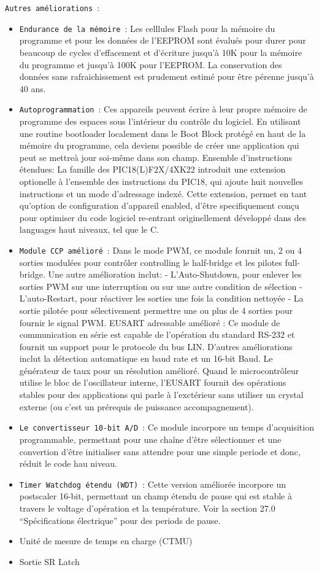 \documentclass[a4paper, 12pt]{book}
\newcounter{program}[subsection]
\begin{document}
\texttt{Autres améliorations}~:
\begin{itemize}
\item \texttt{Endurance de la mémoire}~:
Les celllules Flash pour la mémoire du programme et pour les données de l’EEPROM sont évalués pour durer pour beaucoup de cycles d’effacement et d’écriture jusqu’à 10K pour la mémoire du programme et jusqu’à 100K pour l’EEPROM. La conservation des données sans rafraichissement est prudement estimé pour être pérenne jusqu’à 40 ans.
\item \texttt{Autoprogrammation}~:
Ces appareils peuvent écrire à leur propre mémoire de programme des espaces sous l’intérieur du contrôle du logiciel. En utilisant une routine bootloader localement dans le Boot Block protégé en haut de la mémoire du programme, cela deviens possible de créer une application qui peut se mettreà jour soi-même dans son champ.
Ensemble d’instructions étendues:
La famille des PIC18(L)F2X/4XK22 introduit une extension optionelle à l’ensemble des instructions du PIC18, qui ajoute huit nouvelles instructions et un mode d’adressage indexé.
Cette extension, permet en tant qu’option de configuration d’appareil enabled, d’être specifiquement conçu pour optimiser du code logiciel re-entrant originellement développé dans des languages haut niveaux, tel que le C.
\item \texttt{Module CCP amélioré}~:
Dans le mode PWM, ce module fournit un, 2 ou 4 sorties modulées pour contrôler controlling le half-bridge et les pilotes full-bridge. Une autre amélioration inclut:
- L’Auto-Shutdown, pour enlever les sorties PWM sur une interruption ou sur une autre condition de sélection
- L’auto-Restart, pour réactiver les sorties une fois la condition nettoyée
- La sortie pilotée pour sélectivement permettre une ou plus de 4 sorties pour fournir le signal PWM.
EUSART adressable amélioré :
Ce module de communication en série est capable de l’opération du standard RS-232 et fournit un support pour le protocole du bus LIN. D’autres améliorations inclut la détection automatique en baud rate et un 16-bit Baud.
Le générateur de taux pour un résolution amélioré. Quand le microcontrôleur utilise le bloc de l’oscillateur interne, l’EUSART fournit des opérations stables pour des applications qui parle à l’exctérieur sans utiliser
un crystal externe (ou c’est un prérequis de puissance accompagnement).
\item \texttt{Le convertisseur 10-bit A/D}~:
Ce module incorpore un temps d’acquisition programmable, permettant pour une chaîne d’être sélectionner et une convertion d’être initialiser sans attendre pour une simple periode et donc, réduit le code hau niveau.
\item \texttt{Timer Watchdog étendu (WDT)}~:
Cette version améliorée incorpore un postscaler 16-bit, permettant un champ étendu de pause qui est stable à travers le voltage d’opération et la température. Voir la section 27.0 “Spécifications électrique” pour des periods de pause.
\item Unité de mesure de temps en charge (CTMU)
\item Sortie SR Latch\\
\end{itemize}
\end{document}
